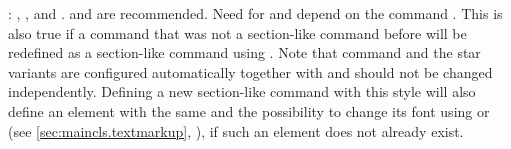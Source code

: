\begin{labeling}{:}
  , , and .  
  and  are recommended. Need for  and
   depend on the command . This is also true
  if a command that was not a section-like command before will be redefined as
  a section-like command using
  . Note that command
   and the star variants are configured automatically together
  with  and should not be changed
  independently. Defining a new section-like command with this style will also
  define an element with the same  and the possibility to change
  its font using  or
   (see \autoref{sec:maincls.textmarkup},
  ), if such an element does not already
  exist.
\end{labeling}

